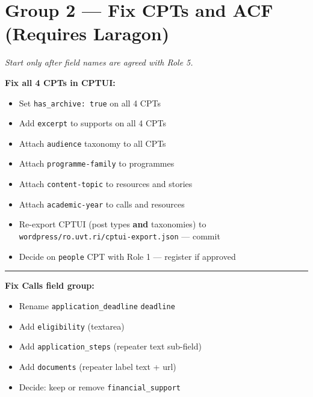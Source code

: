\documentclass[11pt,a4paper]{article}
\newcommand{\grouprule}{\vspace{0.3em}\textcolor{ruleLine}{\rule{\linewidth}{0.4pt}}\vspace{0.3em}}
\begin{document}
\section{Group 2 --- Fix CPTs and ACF (Requires Laragon)}

\textit{Start only after field names are agreed with Role 5.}

\vspace{0.5em}
\noindent\textbf{Fix all 4 CPTs in CPTUI:}

\begin{itemize}
    \item[$\square$] Set \texttt{has\_archive: true} on all 4 CPTs
    \item[$\square$] Add \texttt{excerpt} to supports on all 4 CPTs
    \item[$\square$] Attach \texttt{audience} taxonomy to all CPTs
    \item[$\square$] Attach \texttt{programme-family} to programmes
    \item[$\square$] Attach \texttt{content-topic} to resources and stories
    \item[$\square$] Attach \texttt{academic-year} to calls and resources
    \item[$\square$] Re-export CPTUI (post types \textbf{and} taxonomies) to \texttt{wordpress/ro.uvt.ri/cptui-export.json} --- commit
    \item[$\square$] Decide on \texttt{people} CPT with Role 1 --- register if approved
\end{itemize}

\grouprule

\noindent\textbf{Fix Calls field group:}

\begin{itemize}
    \item[$\square$] Rename \texttt{application\_deadline} \textrightarrow{} \texttt{deadline}
    \item[$\square$] Add \texttt{eligibility} (textarea)
    \item[$\square$] Add \texttt{application\_steps} (repeater \textrightarrow{} text sub-field)
    \item[$\square$] Add \texttt{documents} (repeater \textrightarrow{} label text + url)
    \item[$\square$] Decide: keep or remove \texttt{financial\_support}
\end{itemize}
\end{document}
